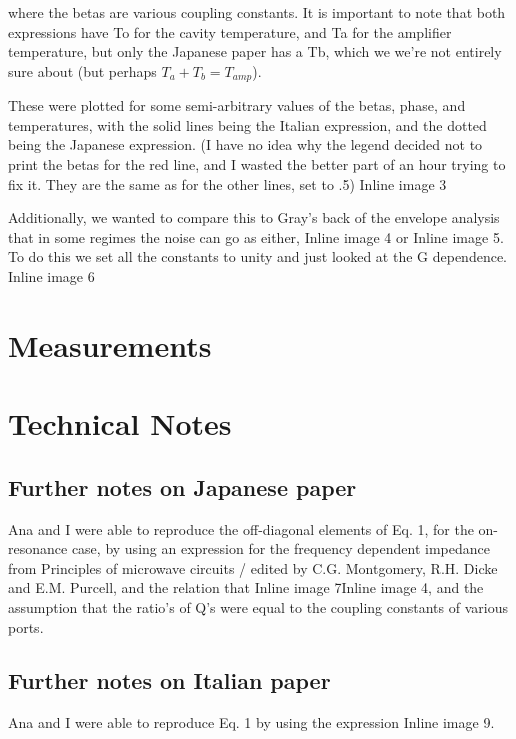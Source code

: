 \documentclass[12pt]{article}
\begin{document}
where the betas are various coupling constants.  It is important to note that both expressions have To for the cavity temperature, and Ta for the amplifier temperature, but only the Japanese paper has a Tb, which we we're not entirely sure about (but perhaps $T_{a} + T_{b} = T_{amp}$).

These were plotted for some semi-arbitrary values of the betas, phase, and temperatures, with the solid lines being the Italian expression, and the dotted being the Japanese expression. (I have no idea why the legend decided not to print the betas for the red line, and I wasted the better part of an hour trying to fix it. They are the same as for the other lines, set to .5)
Inline image 3

Additionally, we wanted to compare this to Gray's back of the envelope analysis that in some regimes the noise can go as either, Inline image 4 or Inline image 5.  To do this we set all the constants to unity and just looked at the G dependence.
Inline image 6

\section{Measurements}

\section{Technical Notes}

\subsection{Further notes on Japanese paper}

Ana and I were able to reproduce the off-diagonal elements of Eq. 1, for the on-resonance case, by using an expression for the frequency dependent impedance from Principles of microwave circuits / edited by C.G. Montgomery, R.H. Dicke and E.M. Purcell, and the relation that Inline image 7Inline image 4, and the assumption that the ratio's of Q's were equal to the coupling constants of various ports.

\subsection{Further notes on Italian paper}
Ana and I were able to reproduce Eq. 1 by using the expression Inline image 9. 
\end{document}

